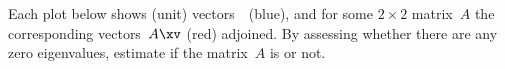 \begin{exercise}  
Each plot below shows (unit) vectors~\xv\ (blue), and for some \(2\times 2\) matrix~\(A\) the corresponding vectors~\(A\xv\) (red) adjoined. 
By assessing whether there are any zero eigenvalues, estimate if the matrix~\(A\) is  or not.

\begin{Parts}
\item{}%

\item{}

\begin{reduce}
\item{}

\item{}%
\end{reduce}

\item{}

\item{}

\end{Parts}
\end{exercise}


